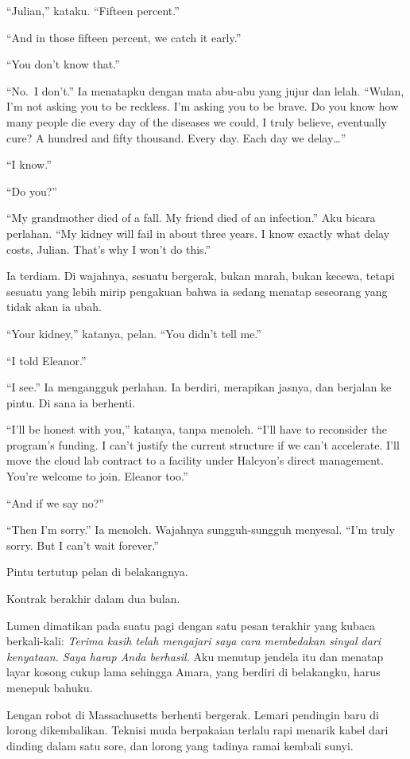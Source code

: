 \documentclass[11pt,twoside,openany]{book}
\makeatletter
\newcommand{\scenebreak}{\par\vspace{0.9em}{\centering\textsc{*\hspace{0.7em}*\hspace{0.7em}*}\par}\vspace{0.9em}\@afterindentfalse\@afterheading}
\makeatother
\begin{document}
``Julian,'' kataku. ``Fifteen percent.''

``And in those fifteen percent, we catch it early.''

``You don't know that.''

``No.~I don't.'' Ia menatapku dengan mata abu-abu yang jujur dan lelah. ``Wulan, I'm not asking you to be reckless. I'm asking you to be brave. Do you know how many people die every day of the diseases we could, I truly believe, eventually cure? A hundred and fifty thousand. Every day. Each day we delay\ldots{}''

``I know.''

``Do you?''

``My grandmother died of a fall. My friend died of an infection.'' Aku bicara perlahan. ``My kidney will fail in about three years. I know exactly what delay costs, Julian. That's why I won't do this.''

Ia terdiam. Di wajahnya, sesuatu bergerak, bukan marah, bukan kecewa, tetapi sesuatu yang lebih mirip pengakuan bahwa ia sedang menatap seseorang yang tidak akan ia ubah.

``Your kidney,'' katanya, pelan. ``You didn't tell me.''

``I told Eleanor.''

``I see.'' Ia mengangguk perlahan. Ia berdiri, merapikan jasnya, dan berjalan ke pintu. Di sana ia berhenti.

``I'll be honest with you,'' katanya, tanpa menoleh. ``I'll have to reconsider the program's funding. I can't justify the current structure if we can't accelerate. I'll move the cloud lab contract to a facility under Halcyon's direct management. You're welcome to join. Eleanor too.''

``And if we say no?''

``Then I'm sorry.'' Ia menoleh. Wajahnya sungguh-sungguh menyesal. ``I'm truly sorry. But I can't wait forever.''

Pintu tertutup pelan di belakangnya.

\scenebreak
Kontrak berakhir dalam dua bulan.

Lumen dimatikan pada suatu pagi dengan satu pesan terakhir yang kubaca berkali-kali: \emph{Terima kasih telah mengajari saya cara membedakan sinyal dari kenyataan. Saya harap Anda berhasil.} Aku menutup jendela itu dan menatap layar kosong cukup lama sehingga Amara, yang berdiri di belakangku, harus menepuk bahuku.

Lengan robot di Massachusetts berhenti bergerak. Lemari pendingin baru di lorong dikembalikan. Teknisi muda berpakaian terlalu rapi menarik kabel dari dinding dalam satu sore, dan lorong yang tadinya ramai kembali sunyi.
\end{document}
